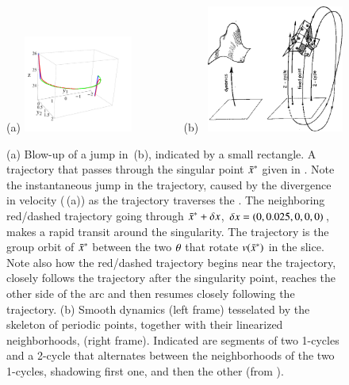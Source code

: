 \documentclass[preprint,12pt]{elsarticle} %
\begin{document}
 \begin{figure}
 \begin{center}
(a) \includegraphics[width=0.32\textwidth]{singpass1}%
~~~~~~~~
(b)~ \includegraphics[width=0.40\textwidth]{f_1_08_1}
 \end{center}
 \caption{\label{fig:singpass}
(a)
Blow-up of a jump in \,(b), indicated by a small
rectangle.
 A trajectory that passes through the singular point
$\bar{x}^*$ given in . Note the instantaneous jump in
the trajectory,  caused by the divergence in velocity
(\,(a)) as the trajectory traverses the {\sset}.
The neighboring red/dashed trajectory going through $\bar{x}^*+\delta
x$, $\delta x =(0,0.025,0,0,0)$, makes a rapid transit around the
singularity. The  trajectory is the group orbit of $\bar{x}^*$
between the two ${\bf \theta}$ that rotate $v(\bar{x}^*)$ in the slice. Note
also how the red/dashed trajectory begins near the 
trajectory, closely follows the  trajectory after the singularity
point, reaches the other side of the  arc and then resumes
closely following the  trajectory.
(b)
Smooth dynamics  (left frame) tesselated by the skeleton of periodic
points, together with their linearized neighborhoods, (right frame).
Indicated are segments of two 1-cycles and a 2-cycle that alternates
between the neighborhoods of the two 1-cycles, shadowing first one, and
then the other
(from \wwwcb{}).
 }%
 \end{figure}
\end{document}
